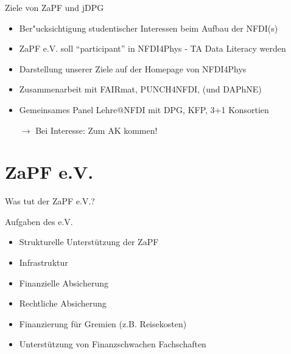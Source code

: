 \documentclass[compress, aspectratio=169]{beamer}
\begin{document}
\begin{frame}{\insertsubsection}
	Ziele von ZaPF und jDPG
	\begin{itemize}
		\item Ber"ucksichtigung studentischer Interessen beim Aufbau der NFDI(s)
		\item ZaPF e.V. soll ``participant'' in NFDI4Phys - TA Data Literacy werden
		\item Darstellung unserer Ziele auf der Homepage von NFDI4Phys
		\item Zusammenarbeit mit FAIRmat, PUNCH4NFDI, (und DAPhNE) 
		\item Gemeinsames Panel Lehre@NFDI mit DPG, KFP, 3+1 Konsortien
		\vspace{4mm}\item[$\rightarrow$] Bei Interesse: Zum AK kommen!
	\end{itemize}
\end{frame}

\section{ZaPF e.V.}

\begin{frame}{Was tut der ZaPF e.V.?}
  \begin{block}{Aufgaben des e.V.}
    \begin{itemize}
      \item Strukturelle Unterstützung der ZaPF
      \item Infrastruktur
      \item Finanzielle Absicherung
      \item Rechtliche Absicherung
      \item Finanzierung für Gremien (z.B. Reisekosten)
      \item Unterstützung von Finanzschwachen Fachschaften
    \end{itemize}
  \end{block}
\end{frame}
  
\end{document}
